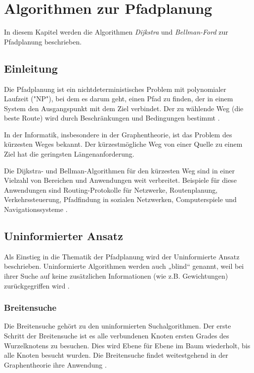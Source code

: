 \chapter{Algorithmen zur Pfadplanung}
In diesem Kapitel werden die Algorithmen \emph{Dijkstra} und \emph{Bellman-Ford} zur Pfadplanung beschrieben.

\section{Einleitung}
\label{Was ist Pfadplanung?}
Die Pfadplanung ist ein nichtdeterministisches Problem mit polynomialer Laufzeit ("NP"), bei dem es darum geht, einen Pfad zu finden, 
der in einem System den Ausgangspunkt mit dem Ziel verbindet. Der zu wählende Weg (die beste Route) wird durch Beschränkungen 
und Bedingungen bestimmt \cite{Karur:21}.

In der Informatik, insbesondere in der Graphentheorie, ist das Problem des kürzesten Weges bekannt. Der kürzestmögliche Weg von 
einer Quelle zu einem Ziel hat die geringsten Längenanforderung.

Die Dijkstra- und Bellman-Algorithmen für den kürzesten Weg sind in einer Vielzahl von Bereichen und Anwendungen
weit verbreitet. Beispiele für diese Anwendungen sind Routing-Protokolle für Netzwerke, Routenplanung, 
Verkehrssteuerung, Pfadfindung in sozialen Netzwerken, Computerspiele und Navigationssysteme \cite{Panda:18}.

\section{Uninformierter Ansatz}
\label{Uninformierter Ansatz}
Als Einstieg in die Thematik der Pfadplanung wird der Uninformierte Ansatz beschrieben.
Uninformierte Algorithmen werden auch „blind“ genannt, weil bei ihrer 
Suche auf keine zusätzlichen Informationen (wie z.B. Gewichtungen) zurückgegriffen wird \cite[81]{Russell:10}.
\subsection{Breitensuche}
\label{Breitensuche}
Die Breitensuche gehört zu den uninformierten Suchalgorithmen. 
Der erste Schritt der Breitensuche ist es alle verbundenen Knoten ersten Grades des Wurzelknotens zu besuchen.
Dies wird Ebene für Ebene im Baum wiederholt, bis alle Knoten besucht wurden. 
Die Breitensuche findet weitestgehend in der Graphentheorie ihre Anwendung \cite[81]{Russell:10}.
\\
\\
\\
\\
